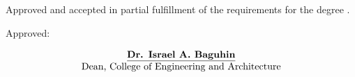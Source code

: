 {\noindent Approved and accepted  in partial fulfillment of the requirements for the degree { \program}.

\bigskip
\noindent Approved:\vspace{0.5in}
\begin{flushleft}
	$$
	\begin{array}{ccc}
		&\underline{\text{\bf Dr. Israel A. Baguhin}}&\\
		&\text{Dean, College of Engineering and Architecture}&\\
		&\text{}
	\end{array}
	$$
\end{flushleft}



}

